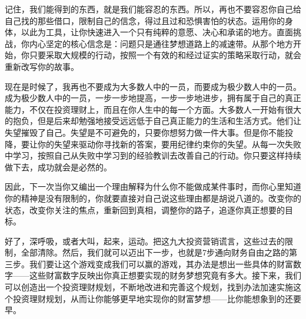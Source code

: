 记住，我们能得到的东西，就是我们能容忍的东西。所以，再也不要容忍你自己给自己找的那些借口，限制自己的信念，得过且过和恐惧害怕的状态。运用你的身体，以此为工具，让你快速进入一个只有纯粹的意愿、决心和承诺的地方。直面挑战，你内心坚定的核心信念是：问题只是通往梦想道路上的减速带。从那个地方开始，你只要采取大规模的行动，按照一个有效的和经过证实的策略采取行动，就会重新改写你的故事。

现在是时候了，我再也不要成为大多数人中的一员，而要成为极少数人中的一员。成为极少数人中的一员，一步一步地提高，一步一步地进步，拥有属于自己的真正能力，不仅在投资理财上，而且在你人生中的每一个方面。大多数人一开始有很大的抱负，但是后来却勉强地接受远远低于自己真正能力的生活和生活方式。他们让失望摧毁了自己。失望是不可避免的，只要你想努力做一件大事。但是你不能投降，要让你的失望来驱动你寻找新的答案，要用纪律约束你的失望。从每一次失败中学习，按照自己从失败中学习到的经验教训去改善自己的行动。你只要这样持续做下去，成功就会是必然的。

因此，下一次当你又编出一个理由解释为什么你不能做成某件事时，而你心里知道你的精神是没有限制的，你就要直接对自己说这些理由都是胡说八道的。改变你的状态，改变你关注的焦点，重新回到真相，调整你的路子，追逐你真正想要的目标。

好了，深呼吸，或者大叫，起来，运动。把这九大投资营销谎言，这些过去的限制，全部清除。然后，我们就可以迈出下一步，也就是7步通向财务自由之路的第三步。我们要让这个游戏变成我们可以赢的游戏，其办法是想出一些具体的财富数字——这些财富数字反映出你真正想要实现的财务梦想究竟有多大。接下来，我们可以创造出一个投资理财规划，不断地改进和完善这个规划，找到办法加速实施这个投资理财规划，从而让你能够更早地实现你的财富梦想——比你能想象到的还要早。
